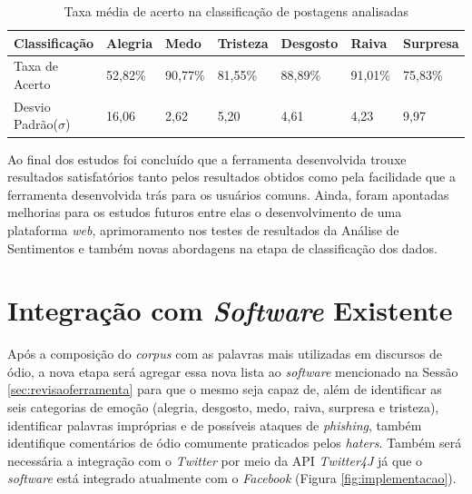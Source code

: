 \begin{table}[h!]
  \begin{center}
    \caption{Taxa média de acerto na classificação de postagens analisadas}
    \label{tab:taxaacerto}
    \begin{tabular}{lllllll} %
      \textbf{Classificação} & \textbf{Alegria} & \textbf{Medo} & \textbf{Tristeza} & \textbf{Desgosto} & \textbf{Raiva} & \textbf{Surpresa}\\
      \hline
      Taxa de Acerto&52,82\%&90,77\%&81,55\%&88,89\%&91,01\%&75,83\%\\
      Desvio Padrão($\sigma$)&16,06&2,62&5,20&4,61&4,23&9,97\\
      \hline
    \end{tabular}
  \end{center}
\end{table}

Ao final dos estudos foi concluído que a ferramenta desenvolvida trouxe resultados satisfatórios tanto pelos resultados obtidos como pela facilidade que a ferramenta desenvolvida trás para os usuários comuns. Ainda, foram apontadas melhorias para os estudos futuros entre elas o desenvolvimento de uma plataforma \textit{web}, aprimoramento nos testes de resultados da Análise de Sentimentos e também novas abordagens na etapa de classificação dos dados. 

\section{Integração com \textit{Software} Existente}
\label{sec:integracaosoftware}
Após a composição do \textit{corpus} com as palavras mais utilizadas em discursos de ódio, a nova etapa será agregar essa nova lista ao \textit{software} mencionado na Sessão \ref{sec:revisaoferramenta} para que o mesmo seja capaz de, além de identificar as seis categorias de emoção (alegria, desgosto, medo, raiva, surpresa e tristeza), identificar palavras impróprias e de possíveis ataques de \textit{phishing}, também identifique comentários de ódio comumente praticados pelos \textit{haters}.
Também será necessária a integração com o \textit{Twitter} por meio da API \textit{Twitter4J} já que o \textit{software} está integrado atualmente com o \textit{Facebook} (Figura \ref{fig:implementacao}). 

